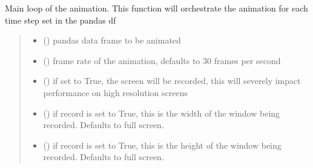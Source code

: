 \documentclass[letterpaper,10pt,english]{sphinxmanual}
\begin{document}
\begin{fulllineitems}
\begin{fulllineitems}
\label{\detokenize{index:sjvisualizer.Canvas.canvas.play}}
\pysigstartsignatures
{}
\pysigstopsignatures
\sphinxAtStartPar
Main loop of the animation. This function will orchestrate the animation for each time step set in the pandas df
\begin{quote}\begin{description}
\begin{itemize}
\item {} 
\sphinxAtStartPar
{} () \textendash{} pandas data frame to be animated

\item {} 
\sphinxAtStartPar
{} () \textendash{} frame rate of the animation, defaults to 30 frames per second

\item {} 
\sphinxAtStartPar
{} () \textendash{} if set to True, the screen will be recorded, this will severely impact performance on high resolution screens

\item {} 
\sphinxAtStartPar
{} () \textendash{} if record is set to True, this is the width of the window being recorded. Defaults to full screen.

\item {} 
\sphinxAtStartPar
{} () \textendash{} if record is set to True, this is the height of the window being recorded. Defaults to full screen.


\end{itemize}
\end{description}
\end{quote}
\end{fulllineitems}
\end{fulllineitems}
\end{document}
